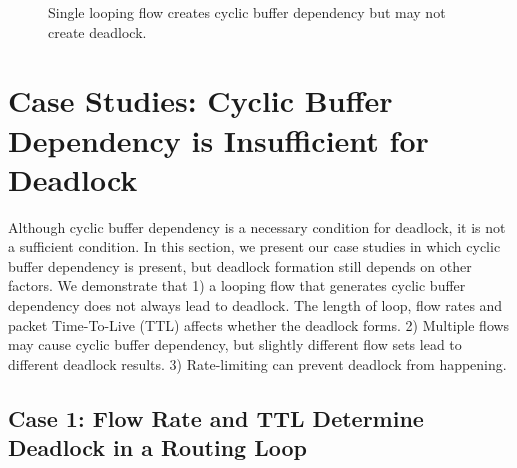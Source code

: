 \begin{figure}[t]
\centering
{}
\vspace{-0.15in}
\caption{Single looping flow creates cyclic buffer dependency but may not create deadlock.}
\vspace{-0.15in}
\label{fig:loop}
\end{figure}

\secspacelarge
\section{Case Studies: Cyclic Buffer Dependency is Insufficient for Deadlock}
\label{sec:analysis}
\secspace

Although cyclic buffer dependency is a necessary condition for deadlock, it is not a
sufficient condition. In this section, we present our case studies in which cyclic
buffer dependency is present, but deadlock formation still depends on other factors. We demonstrate
that 1) a looping flow that generates cyclic buffer dependency does not always lead to deadlock.
The length of loop, flow rates and packet Time-To-Live (TTL) affects whether
the deadlock forms. 2) Multiple flows may cause cyclic buffer dependency,
but slightly different flow sets lead to different deadlock results. 3) Rate-limiting can
prevent deadlock from happening.

\secspace
\subsection{Case 1: Flow Rate and TTL Determine Deadlock in a Routing Loop}
\secspace


